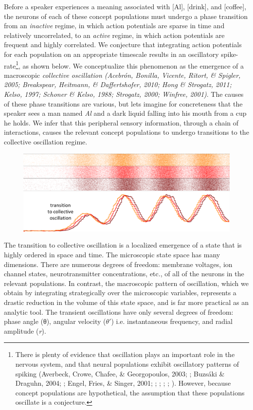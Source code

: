 Before a speaker experiences a meaning associated with [Al], [drink], and [coffee], the neurons of each of these concept populations must undergo a phase transition from an \textit{inactive} regime, in which action potentials are sparse in time and relatively uncorrelated, to an \textit{active} regime, in which action potentials are frequent and highly correlated. We conjecture that integrating action potentials for each population on an appropriate timescale results in an oscillatory spike-rate\footnote{There is plenty of evidence that oscillation plays an important role in the nervous system, and that neural populations exhibit oscillatory patterns of spiking (Averbeck, Crowe, Chafee, \& Georgopoulos, 2003; \citealt{Buzsaki2006}; Buzsáki \& Draguhn, 2004; \citealt{CanoltyKnight2010}; Engel, Fries, \& Singer, 2001; \citealt{Fuster2001}; \citealt{GerstnerKistler2002}; \citealt{Izhikevich2006,Izhikevich2007}; \citealt{IzhikevichEdelman2008}; \citealt{Klimesch1999}). However, because concept populations are hypothetical, the assumption that these populations oscillate is a conjecture.}, as shown below. We conceptualize this phenomenon as the emergence of a macroscopic \textit{collective oscillation (Acebrón, Bonilla, Vicente, Ritort, \& Spigler, 2005; Breakspear, Heitmann, \& Daffertshofer, 2010; Hong \& Strogatz, 2011; Kelso, 1997; Schoner \& Kelso, 1988; Strogatz, 2000; Winfree, 2001)}. The causes of these phase transitions are various, but lets imagine for concreteness that the speaker sees a man named \textit{Al} and a dark liquid falling into his mouth from a cup he holds. We infer that this peripheral sensory information, through a chain of interactions, causes the relevant concept populations to undergo transitions to the collective oscillation regime.

  
\begin{figure}
\includegraphics[width=\textwidth]{figures/Tilsen-img10.png}
\caption{\missingcaption}
\label{fig:}
\end{figure}
 

  The transition to collective oscillation is a localized emergence of a state that is highly ordered in space and time. The microscopic state space has many dimensions. There are numerous degrees of freedom: membrane voltages, ion channel states, neurotransmitter concentrations, etc., of all of the neurons in the relevant populations. In contrast, the macroscopic pattern of oscillation, which we obtain by integrating strategically over the microscopic variables, represents a drastic reduction in the volume of this state space, and is far more practical as an analytic tool. The transient oscillations have only several degrees of freedom: phase angle (θ), angular velocity ($\theta ′$) i.e. instantaneous frequency, and radial amplitude (\textit{r}).

